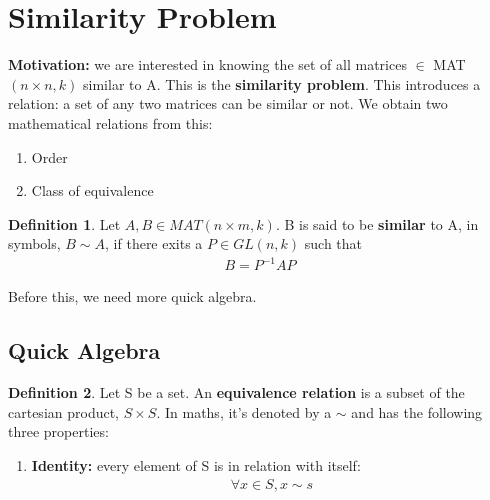 \documentclass[a4paper, 12pt]{article}
\theoremstyle{definition}
\theoremstyle{definition}
\newtheorem{defn}{Definition}[section]
\theoremstyle{definition}
\theoremstyle{definition}
\begin{document}
{\section{Similarity Problem}
\textbf{Motivation:} we are interested in knowing the set of all matrices $\in$ MAT $(n \times n, k)$ similar to A. This is the \textbf{similarity problem}. This introduces a relation: a set of any two matrices can be similar or not. We obtain two mathematical relations from this: 
\begin{enumerate}
	\item Order
	\item Class of equivalence
\end{enumerate}
\begin{defn}
	Let $A, B \in MAT (n \times m, k)$. B is said to be \textbf{similar} to A, in symbols, $B \sim A$, if there exits a $P \in GL(n,k)$ such that
	\begin{align*}
		B = P^{-1} A P 
	\end{align*}
\end{defn}
Before this, we need more quick algebra. 
\subsection{Quick Algebra}
\begin{defn}
	Let S be a set. An \textbf{equivalence relation} is a subset of the cartesian product, $S \times S$. In maths, it's denoted by a $\sim$ and has the following three properties: 
	\begin{enumerate}
		\item \textbf{Identity:} every element of S is in relation with itself: 
		\begin{align*}
			\forall x \in S, x \sim s
		\end{align*}


\end{enumerate}
\end{defn}}
\end{document}
